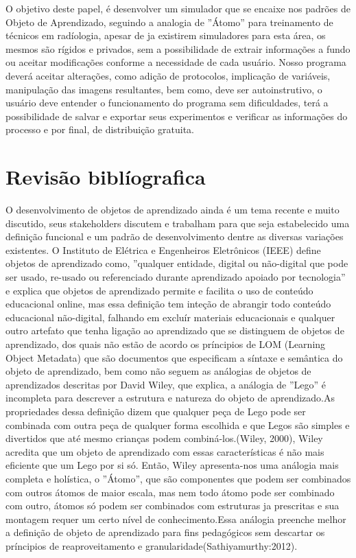 \documentclass[12pt,openright,oneside,a4paper,english,french,spanish,brazil]{unifil}
\begin{document}
	O objetivo deste papel, é desenvolver um simulador que se encaixe nos padrões de Objeto de Aprendizado, seguindo a analogia de ''Átomo'' para treinamento de técnicos em radíologia, apesar de ja existirem simuladores para esta área, os mesmos são rígidos e privados, sem a possibilidade de extrair informações a fundo ou aceitar modificações conforme a necessidade de cada usuário. Nosso programa deverá aceitar alterações, como adição de protocolos, implicação de variáveis, manipulação das imagens resultantes, bem como, deve ser autoinstrutivo, o usuário deve entender o funcionamento do programa sem dificuldades, terá a possibilidade de salvar e exportar seus experimentos e verificar as informações do processo e por final, de distribuição gratuita.

\chapter{Revisão biblíografica}%

O desenvolvimento de objetos de aprendizado ainda é um tema recente e muito discutido, seus stakeholders  discutem e trabalham para que seja estabelecido uma definição funcional e um padrão de desenvolvimento dentre  as diversas variações existentes. O Instituto de Elétrica e Engenheiros Eletrônicos (IEEE)  define objetos de aprendizado como, ''qualquer entidade, digital ou não-digital que pode ser usado, re-usado ou referenciado durante aprendizado apoiado por tecnologia'' e explica que objetos de aprendizado permite e facilita o uso de conteúdo educacional online, mas essa definição tem inteção de abrangir todo conteúdo educacional não-digital, falhando em excluír materiais educacionais e qualquer outro artefato que tenha ligação ao aprendizado que se distinguem de objetos de aprendizado, dos quais não estão de acordo os príncipios de LOM (Learning Object Metadata) que são documentos que especificam a síntaxe e semântica do objeto de aprendizado, bem como não seguem as análogias de objetos de aprendizados descritas por David Wiley, que explica, a análogia de ''Lego'' é incompleta para descrever a estrutura e natureza do objeto de aprendizado.As propriedades dessa definição dizem que qualquer peça de Lego pode ser combinada com outra peça de qualquer forma escolhida e que Legos são simples e divertidos que até mesmo crianças podem combiná-los.(Wiley, 2000), Wiley acredita que um objeto de aprendizado com essas características é não mais eficiente que um Lego por si só. Então, Wiley apresenta-nos uma análogia mais completa e holística, o ''Átomo'', que são componentes que podem ser combinados com outros átomos de maior escala, mas nem todo átomo pode ser combinado com outro, átomos só podem ser combinados com estruturas ja prescritas e sua montagem requer um certo nível de conhecimento.Essa análogia preenche melhor a definição de objeto de aprendizado para fins pedagógicos sem descartar os príncipios de reaproveitamento e granularidade(Sathiyamurthy:2012).
\end{document}
